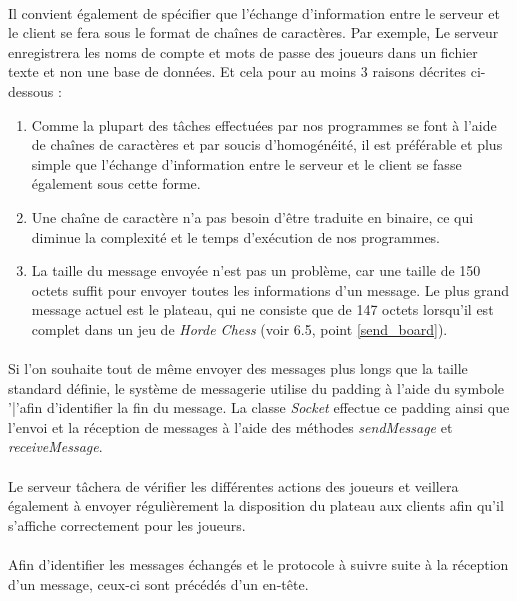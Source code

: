 \documentclass[10pt, a4paper]{article}
\begin{document}
\paragraph{}Il convient également de spécifier que l'échange d'information entre le serveur et le client se fera sous le format de chaînes de caractères. Par exemple, Le serveur enregistrera les noms de compte et mots de passe des joueurs dans un fichier texte et non une base de données. Et cela pour au moins 3 raisons décrites ci-dessous :
\begin{enumerate}
\item Comme la plupart des tâches effectuées par nos programmes se font à l'aide de chaînes de caractères et par soucis d'homogénéité, il est préférable et plus simple que l'échange d'information entre le serveur et le client se fasse également sous cette forme.
\item Une chaîne de caractère n'a pas besoin d'être traduite en binaire, ce qui diminue la complexité et le temps d'exécution de nos programmes.
\item La taille du message envoyée n'est pas un problème, car une taille de 150 octets suffit pour envoyer toutes les informations d'un message. Le plus grand message actuel est le plateau, qui ne consiste que de 147 octets lorsqu'il est complet dans un jeu de \textit{Horde Chess} (voir 6.5, point \ref{send_board}).
\end{enumerate}
\paragraph{}Si l'on souhaite tout de même envoyer des messages plus longs que la taille standard définie, le système de messagerie utilise du padding à l'aide du symbole '|'afin d'identifier la fin du message. La classe \textit{Socket} effectue ce padding ainsi que l'envoi et la réception de messages à l'aide des méthodes \textit{sendMessage} et \textit{receiveMessage}.
\paragraph{}Le serveur tâchera de vérifier les différentes actions des joueurs et veillera également à envoyer régulièrement la disposition du plateau aux clients afin qu'il s'affiche correctement pour les joueurs.
\paragraph{}Afin d'identifier les messages échangés et le protocole à suivre suite à la réception d'un message, ceux-ci sont précédés d'un en-tête.
\end{document}
